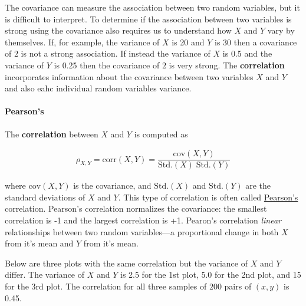 \documentclass[11pt]{article}
\begin{document}
The covariance can measure the association between two random variables,
but it is difficult to interpret. To determine if the association
between two variables is strong using the covariance also requires us to
understand how \(X\) and \(Y\) vary by themselves. If, for example, the
variance of \(X\) is 20 and \(Y\) is 30 then a covariance of \(2\) is
not a strong association. If instead the variance of \(X\) is 0.5 and
the variance of \(Y\) is 0.25 then the covariance of \(2\) is very
strong. The \textbf{correlation} incorporates information about the
covariance between two variables \(X\) and \(Y\) and also eahc
individual random variables variance.

\hypertarget{pearsons}{%
\paragraph{Pearson's}\label{pearsons}}

The \textbf{correlation} between \(X\) and \(Y\) is computed as

\begin{align}
    \rho_{X,Y} = \text{corr}\left( X,Y \right) = \dfrac{ \text{cov}(X,Y) }{ \text{Std.}(X) \; \text{Std.}(Y) }
\end{align}

where \(\text{cov}(X,Y)\) is the covariance, and \(\text{Std.}(X)\) and
\(\text{Std.}(Y)\) are the standard deviations of \(X\) and \(Y\). This
type of correlation is often called
\href{https://en.wikipedia.org/wiki/Karl_Pearson}{Pearson's}
correlation. Pearson's correlation normalizes the covariance: the
smallest correlation is -1 and the largest correlation is +1. Pearon's
correlation \emph{linear} relationships between two random variables---a
proportional change in both \(X\) from it's mean and \(Y\) from it's
mean.

Below are three plots with the same correlation but the variance of
\(X\) and \(Y\) differ. The variance of \(X\) and \(Y\) is 2.5 for the
1st plot, 5.0 for the 2nd plot, and 15 for the 3rd plot. The correlation
for all three samples of \(200\) pairs of \((x,y)\) is 0.45.
\end{document}

